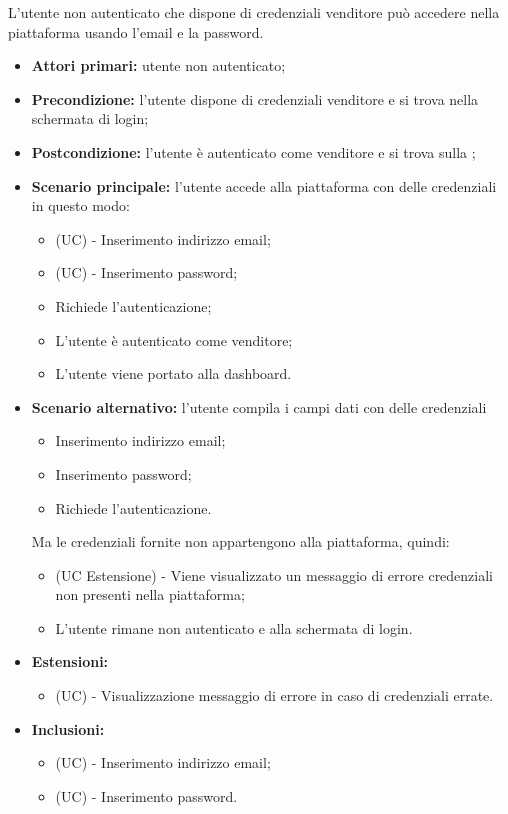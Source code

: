 L'utente non autenticato che dispone di credenziali venditore può accedere nella piattaforma usando l'email e la password.
\begin{itemize}
    \item \textbf{Attori primari:} utente non autenticato;
    \item \textbf{Precondizione:} l'utente dispone di credenziali venditore e si trova nella schermata di login;
    \item \textbf{Postcondizione:} l'utente è autenticato come venditore e si trova sulla ;
    \item \textbf{Scenario principale:} l'utente accede alla piattaforma con delle credenziali in questo modo:
    \begin{itemize}
        \item (UC) - Inserimento indirizzo email;
        \item (UC) - Inserimento password;
        \item Richiede l'autenticazione;
        \item L'utente è autenticato come venditore;
        \item L'utente viene portato alla dashboard.
    \end{itemize}
	\item \textbf{Scenario alternativo:} l'utente compila i campi dati con delle credenziali
	\begin{itemize}
		\item Inserimento indirizzo email;
		\item Inserimento password;
        \item Richiede l'autenticazione.
    \end{itemize}
	Ma le credenziali fornite non appartengono alla piattaforma, quindi:
	\begin{itemize}
		\item (UC Estensione) - Viene visualizzato un messaggio di errore credenziali non presenti nella piattaforma;
		\item L'utente rimane non autenticato e alla schermata di login.
	\end{itemize}
    \item \textbf{Estensioni:}
    \begin{itemize}
        \item (UC) - Visualizzazione messaggio di errore in caso di credenziali errate.
    \end{itemize}
    \item \textbf{Inclusioni:}
    \begin{itemize}
    	\item (UC) - Inserimento indirizzo email;
    	\item (UC) - Inserimento password.
    \end{itemize}
\end{itemize}

